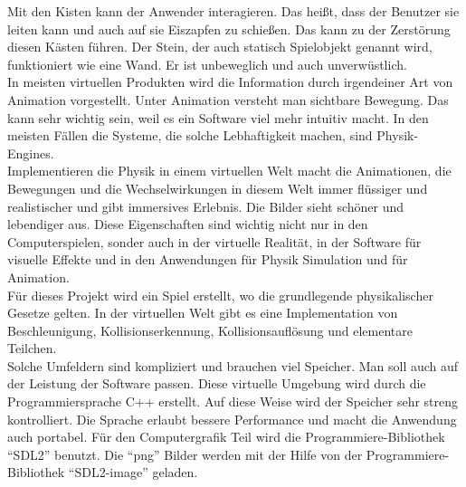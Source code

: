 \documentclass[
  10pt,
  a4paper,
  oneside,
  headers,
  headinclude,
  footinclude,
  BCOR5mm,
]{article}
\begin{document}
\justify
Mit den Kisten kann der Anwender interagieren. Das heißt, dass der Benutzer sie
leiten kann und auch auf sie Eiszapfen zu schießen. Das kann zu der
Zerstörung diesen Kästen führen. Der Stein, der auch statisch Spielobjekt
genannt wird, funktioniert wie eine Wand. Er ist unbeweglich und auch
unverwüstlich. \\
In meisten virtuellen Produkten wird die Information durch irgendeiner Art von
Animation vorgestellt. Unter Animation versteht man sichtbare Bewegung. Das kann
sehr wichtig sein, weil es ein Software viel mehr intuitiv macht. In den meisten
Fällen die Systeme, die solche Lebhaftigkeit machen, sind Physik-Engines. \\
Implementieren die Physik in einem virtuellen Welt macht die Animationen, die
Bewegungen und die Wechselwirkungen in diesem Welt immer flüssiger und
realistischer und gibt immersives Erlebnis. Die Bilder sieht schöner und
lebendiger aus. Diese Eigenschaften sind wichtig nicht nur in den
Computerspielen, sonder auch in der virtuelle Realität, in der Software für
visuelle Effekte und in den Anwendungen für Physik Simulation und für
Animation. \\
Für dieses Projekt wird ein Spiel erstellt, wo die grundlegende physikalischer
Gesetze gelten. In der virtuellen Welt gibt es eine Implementation von
Beschleunigung, Kollisionserkennung, Kollisionsauflösung und elementare
Teilchen. \\
Solche Umfeldern sind kompliziert und brauchen viel Speicher. Man soll auch auf
der Leistung der Software passen. Diese virtuelle Umgebung wird durch die
Programmiersprache C++ erstellt. Auf diese Weise wird der Speicher sehr streng
kontrolliert. Die Sprache erlaubt bessere Performance und macht die Anwendung
auch portabel. Für den Computergrafik Teil wird die Programmiere-Bibliothek
``SDL2'' benutzt. Die ``png'' Bilder werden mit der Hilfe von der
Programmiere-Bibliothek ``SDL2-image'' geladen.\\
\end{document}
